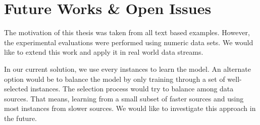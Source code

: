 \section{Future Works \& Open Issues}
The motivation of this thesis was taken from all text based examples. However, the experimental evaluations were performed using numeric data sets. We would like to extend this work and apply it  in real world data streams. 

In our current solution, we use every instances to learn the model. An alternate option would be to balance the model by only training through a set of well-selected instances. The selection process would try to balance among data sources. That means, learning from a small subset of faster sources and using most instances from slower sources. We would like to investigate this approach in the future.





